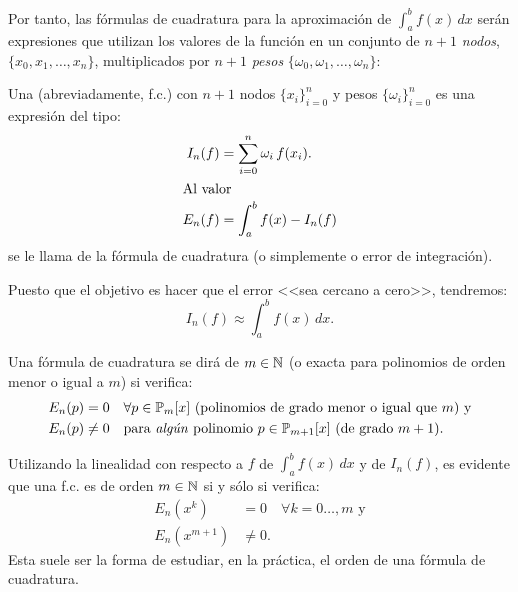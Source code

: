 Por tanto, las fórmulas de cuadratura para la aproximación de
$\int_a^b f(x)\, dx$ serán expresiones que utilizan los valores de la
función en un conjunto de $n+1$ \emph{nodos}, $\{x_0,x_1,\dots,x_n\}$,
multiplicados por $n+1$ \emph{pesos}
$\{\omega_0,\omega_1,\dots,\omega_n\}$:
\begin{definition}
  \label{def:formula-cuadratura}
  Una  (abreviadamente, f.c.) con
  $n+1$ nodos $\{x_i\}_{i=0}^n$ y pesos $\{\omega_i\}_{i=0}^n$ es una
  expresión del tipo:
  \begin{align}
    \label{eq:f.cuadratura}
    I_n(f)&=\sum_{i=0}^n \omega_i \, f(x_i).
    \\
    \intertext{Al valor}
    \notag
    E_n(f) &= \int_a^b f(x) - I_n(f)
  \end{align}
  se le llama  de la fórmula de cuadratura (o
  simplemente  o error de integración).
\end{definition}
Puesto que el objetivo es hacer que el error <<sea cercano a cero>>, tendremos:
\begin{equation*}
  I_n(f) \approx \int_a^b f(x)\, dx.
\end{equation*}

\begin{definition}
  \label{def:2}
  Una fórmula de cuadratura se dirá de  $m\in\operatorname{{\mathbb N}}$ (o
  exacta para polinomios de orden menor o igual a $m$) si verifica:
  \begin{align*}
    E_n(p)&=0 \quad \forall p\in\operatorname{{\mathbb P}}_m[x] \text{ (polinomios
      de grado menor o igual que $m$) y}
    \\
    E_n(p)&\neq 0 \quad \text{para \emph{algún} polinomio }
    p\in\operatorname{{\mathbb P}}_{m+1}[x] \text{ (de grado $m+1$)}.
  \end{align*}
\end{definition}
\begin{remark}
  \label{rk:5}
  Utilizando la linealidad con respecto a $f$ de $\int_a^bf(x)\,dx$ y
  de $I_n(f)$, es evidente que una f.c. es de orden $m\in\operatorname{{\mathbb N}}$ si
  y sólo si verifica:
  \begin{align*}
    E_n(x^k)&=0 \quad \forall k=0\dots,m \text{ y}
    \\
    E_n(x^{m+1})&\neq 0.
  \end{align*}
  Esta suele ser la forma de estudiar, en la práctica, el orden de una
  fórmula de cuadratura.
\end{remark}

